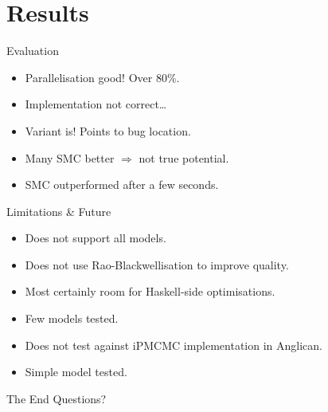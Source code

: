\documentclass[usenames,dvipsnames,10pt]{beamer}
\begin{document}
\section{Results}
\label{sec:results}



\begin{frame}[fragile]{Evaluation}
    \begin{itemize}
        \item Parallelisation good! Over 80\%.
        \item Implementation not correct\dots
        \item Variant is! Points to bug location.
        \item Many SMC better $\Rightarrow$ not true potential.
        \item SMC outperformed after a few seconds.
    \end{itemize}
\end{frame}

\begin{frame}[fragile]{Limitations \& Future}
    \begin{itemize}
        \item Does not support all models.
        \item Does not use Rao-Blackwellisation to improve quality.
        \item Most certainly room for Haskell-side optimisations.
    \end{itemize}
    \begin{itemize}
        \item Few models tested.
        \item Does not test against iPMCMC implementation in Anglican.
        \item Simple model tested.
    \end{itemize}
\end{frame}

\begin{frame}{The End}
    \centering
    \Huge Questions?
\end{frame}
\end{document}
